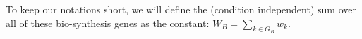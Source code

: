 To keep our notations short, we will define the (condition independent) sum over all of these bio-synthesis genes as the constant: $W_B = \sum_{k\in G_B}w_k$.
